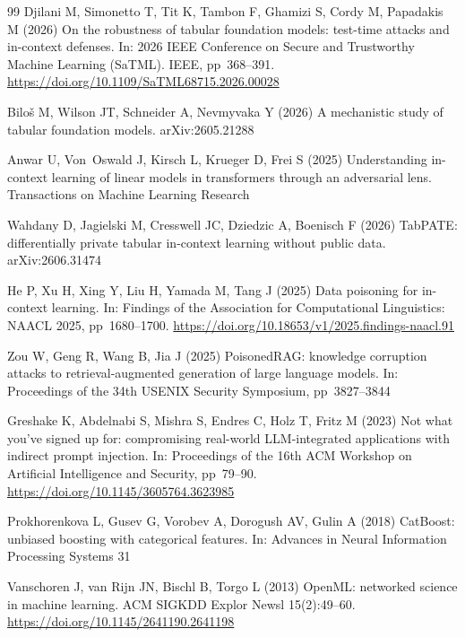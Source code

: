 \documentclass[pdflatex,sn-mathphys-num]{sn-jnl}
\begin{document}
\begin{thebibliography}{99}
Djilani M, Simonetto T, Tit K, Tambon F, Ghamizi S, Cordy M, Papadakis M (2026) On the robustness
of tabular foundation models: test-time attacks and in-context defenses. In: 2026 IEEE Conference on Secure and Trustworthy Machine Learning (SaTML). IEEE, pp~368--391. \url{https://doi.org/10.1109/SaTML68715.2026.00028}

Biloš M, Wilson JT, Schneider A, Nevmyvaka Y (2026) A mechanistic study of tabular foundation
models. arXiv:2605.21288

Anwar U, Von~Oswald J, Kirsch L, Krueger D, Frei S (2025) Understanding in-context learning of
linear models in transformers through an adversarial lens. Transactions on Machine Learning Research

Wahdany D, Jagielski M, Cresswell JC, Dziedzic A, Boenisch F (2026) TabPATE: differentially private
tabular in-context learning without public data. arXiv:2606.31474

He P, Xu H, Xing Y, Liu H, Yamada M, Tang J (2025) Data poisoning for in-context learning. In: Findings of the Association for Computational Linguistics: NAACL 2025, pp~1680--1700. \url{https://doi.org/10.18653/v1/2025.findings-naacl.91}

Zou W, Geng R, Wang B, Jia J (2025) PoisonedRAG: knowledge corruption attacks to retrieval-augmented
generation of large language models. In: Proceedings of the 34th USENIX Security Symposium, pp~3827--3844

Greshake K, Abdelnabi S, Mishra S, Endres C, Holz T, Fritz M (2023) Not what you've signed up for:
compromising real-world LLM-integrated applications with indirect prompt injection. In: Proceedings
of the 16th ACM Workshop on Artificial Intelligence and Security, pp~79--90. \url{https://doi.org/10.1145/3605764.3623985}

Prokhorenkova L, Gusev G, Vorobev A, Dorogush AV, Gulin A (2018) CatBoost: unbiased boosting with
categorical features. In: Advances in Neural Information Processing Systems 31

Vanschoren J, van Rijn JN, Bischl B, Torgo L (2013) OpenML: networked science in machine learning.
ACM SIGKDD Explor Newsl 15(2):49--60. \url{https://doi.org/10.1145/2641190.2641198}


\end{thebibliography}
\end{document}

